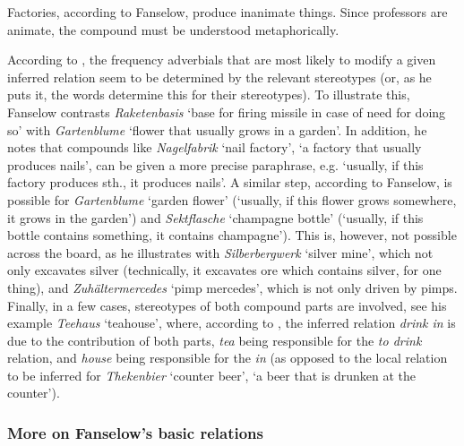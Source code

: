 Factories, according to Fanselow, produce inanimate things. Since professors are animate, the compound
must be understood metaphorically. 

According to \citet[201]{Fanselow:1981}, the frequency
adverbials that are most likely to modify a given inferred relation
seem to be determined by the relevant stereotypes (or, as he puts it,
the words determine this for their stereotypes). To illustrate this, Fanselow contrasts
\emph{Raketenbasis} `base for firing missile in case of need for doing
so' with \emph{Gartenblume} `flower that usually grows in a
garden'. In addition, he notes that compounds like \emph{Nagelfabrik}
`nail factory', `a factory that usually produces nails', can be
given a more precise paraphrase, e.g. `usually, if this factory
  produces sth., it produces nails'. A similar step, according to Fanselow, is
possible for \emph{Gartenblume} `garden flower' (`usually, if
  this flower grows somewhere, it grows in the garden') and
\emph{Sektflasche} `champagne bottle' (`usually, if this bottle
  contains something, it contains champagne'). This is, however, not
possible across the board, as he illustrates with
\emph{Silberbergwerk} `silver mine', which not only excavates silver
(technically, it excavates ore which contains silver, for one thing),
and \emph{Zuhältermercedes} `pimp mercedes', which is not only driven
by pimps. Finally, in a few cases, stereotypes of both compound parts
are involved, see his example \emph{Teehaus} `teahouse', where, according to
\citet[202]{Fanselow:1981}, the inferred relation \emph{drink in} is
due to the contribution of both parts, \emph{tea} being responsible
for the \emph{to drink} relation, and \emph{house} being responsible
for the \emph{in} (as opposed to the local relation to be inferred for \emph{Thekenbier}
`counter beer', `a beer that is drunken at the counter').%

\subsubsection{More on Fanselow's basic relations}
\label{sec:fanselows_basic_relations}

